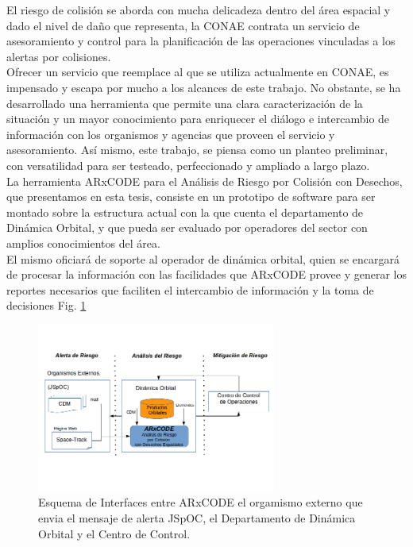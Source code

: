 El riesgo de colisi\'on se aborda con mucha delicadeza dentro del \'area espacial y dado el nivel de da\~no que representa, la CONAE contrata un servicio de asesoramiento y control para la planificaci\'on de las operaciones vinculadas a los alertas por colisiones.\\

Ofrecer un servicio que reemplace al que se utiliza actualmente en CONAE, es impensado y escapa por mucho a los alcances de este trabajo. No obstante, se ha desarrollado una herramienta que permite una clara caracterizaci\'on de la situaci\'on y un mayor conocimiento para enriquecer el di\'alogo e intercambio de informaci\'on con los organismos y agencias que proveen el servicio y asesoramiento. As\'i mismo, este trabajo,  se piensa como un planteo preliminar, con versatilidad para ser testeado, perfeccionado y ampliado a largo plazo.\\

La herramienta ARxCODE para el An\'alisis de Riesgo por Colisi\'on con Desechos, que presentamos en esta tesis, consiste en un prototipo de software para ser montado sobre la estructura actual con la que cuenta el departamento de Din\'amica Orbital, y que pueda ser evaluado por operadores del sector con amplios conocimientos del \'area.\\

El mismo oficiar\'a de soporte al operador de din\'amica orbital, quien se encargar\'a de procesar la informaci\'on con las facilidades que ARxCODE provee y generar los reportes necesarios que faciliten el intercambio de informaci\'on y la toma de decisiones Fig. \ref{fig:arcodeInterface} \\ 


\begin{figure}[!h]
\centering
  \includegraphics[width=0.7\textwidth]{imagenes/interfasessistemas}
  \caption[Interfaces del ARxCODE]{Esquema de Interfaces entre ARxCODE el orgamismo externo que envia el mensaje de alerta JSpOC, el Departamento de Din\'amica Orbital y el Centro de Control.}
  \label{fig:arcodeInterface}
\end{figure}



